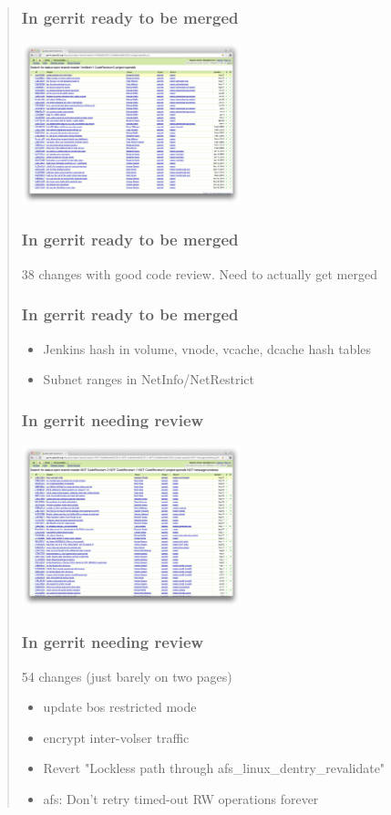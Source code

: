 \documentclass{beamer}
\begin{document}
\begin{frame}[fragile]
\begin{quote}
\begin{frame}
\frametitle{In gerrit ready to be merged}
\includegraphics[width=2.5in]{gerrit-approved}
\end{frame}

\begin{frame}
\frametitle{In gerrit ready to be merged}
38 changes with good code review.
\vspace{1em}
Need to actually get merged

\begin{frame}
\frametitle{In gerrit ready to be merged}
\begin{itemize}
\item{Jenkins hash in volume, vnode, vcache, dcache hash tables}
\item{Subnet ranges in NetInfo/NetRestrict}
\end{itemize}
\end{frame}

\begin{frame}
\frametitle{In gerrit needing review}
\includegraphics[width=2.5in]{gerrit-needsreview}
\end{frame}

\begin{frame}
\frametitle{In gerrit needing review}
54 changes (just barely on two pages)
\begin{itemize}
\item{update bos restricted mode}
\item{encrypt inter-volser traffic}
\item{Revert "Lockless path through afs_linux_dentry_revalidate"}
\item{afs: Don't retry timed-out RW operations forever}
\end{itemize}
\end{frame}


\end{frame}
\end{quote}
\end{frame}
\end{document}
